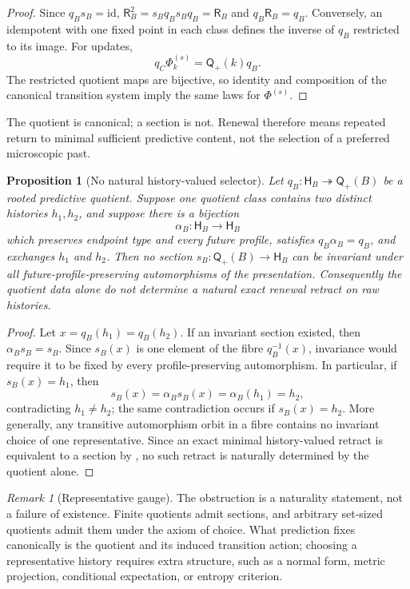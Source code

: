 \documentclass[11pt]{article}
\newtheorem{proposition}[theorem]{Proposition}
\theoremstyle{definition}
\theoremstyle{remark}
\newtheorem{remark}[theorem]{Remark}
\newcommand{\id}{\mathrm{id}}
\newcommand{\Qq}{\mathsf Q}
\begin{document}
\begin{proof}
Since $q_Bs_B=\id$,
$\mathsf R_B^2=s_Bq_Bs_Bq_B=\mathsf R_B$ and
$q_B\mathsf R_B=q_B$.  Conversely, an idempotent with one fixed point in each
class defines the inverse of $q_B$ restricted to its image.  For updates,
\[
 q_C\Phi_k^{(s)}=\Qq_+(k)q_B.
\]
The restricted quotient maps are bijective, so identity and composition of the
canonical transition system imply the same laws for $\Phi^{(s)}$.
\end{proof}

The quotient is canonical; a section is not.  Renewal therefore means repeated
return to minimal sufficient predictive content, not the selection of a
preferred microscopic past.


\begin{proposition}[No natural history-valued selector]
\label{prop:no-natural-selector}
Let \(q_B:\mathsf H_B\twoheadrightarrow\Qq_+(B)\) be a rooted predictive
quotient.  Suppose one quotient class contains two distinct histories
\(h_1,h_2\), and suppose there is a bijection
\[
 \alpha_B:\mathsf H_B\longrightarrow\mathsf H_B
\]
which preserves endpoint type and every future profile, satisfies
\(q_B\alpha_B=q_B\), and exchanges \(h_1\) and \(h_2\).  Then no section
\(s_B:\Qq_+(B)\to\mathsf H_B\) can be invariant under all
future-profile-preserving automorphisms of the presentation.  Consequently
the quotient data alone do not determine a natural exact renewal retract on
raw histories.
\end{proposition}

\begin{proof}
Let \(x=q_B(h_1)=q_B(h_2)\).  If an invariant section existed, then
\(\alpha_Bs_B=s_B\).  Since \(s_B(x)\) is one element of the fibre
\(q_B^{-1}(x)\), invariance would require it to be fixed by every
profile-preserving automorphism.  In particular, if \(s_B(x)=h_1\), then
\[
 s_B(x)=\alpha_Bs_B(x)=\alpha_B(h_1)=h_2,
\]
contradicting \(h_1\ne h_2\); the same contradiction occurs if
\(s_B(x)=h_2\).  More generally, any transitive automorphism orbit in a fibre
contains no invariant choice of one representative.  Since an exact minimal
history-valued retract is equivalent to a section by
, no such retract is naturally determined by the
quotient alone.
\end{proof}

\begin{remark}[Representative gauge]
The obstruction is a naturality statement, not a failure of existence.
Finite quotients admit sections, and arbitrary set-sized quotients admit them
under the axiom of choice.  What prediction fixes canonically is the quotient
and its induced transition action; choosing a representative history requires
extra structure, such as a normal form, metric projection, conditional
expectation, or entropy criterion.
\end{remark}
\end{document}

